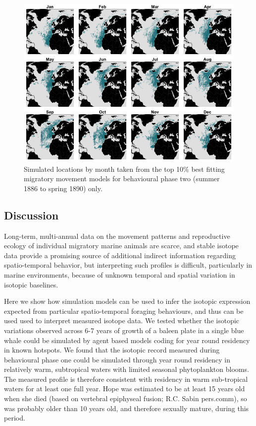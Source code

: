 \documentclass[a4paper,12pt]{article}
\begin{document}
\begin{figure}
 \centering
  \includegraphics[width = \linewidth]{figures/Figure-4-monthly.png}
  \caption{Simulated locations by month taken from the top 10\% best fitting migratory movement models for behavioural phase two (summer 1886 to spring 1890) only.}
  \label{fig4}
\end{figure}

\subsection{Discussion}
Long-term, multi-annual data on the movement patterns and reproductive ecology of individual migratory marine animals are scarce, and stable isotope data provide a promising source of additional indirect information regarding spatio-temporal behavior, but interpreting such profiles is difficult, particularly in marine environments, because of unknown temporal and spatial variation in isotopic baselines.

Here we show how simulation models can be used to infer the isotopic expression expected from particular spatio-temporal foraging behaviours, and thus can be used used to interpret measured isotope data. 
We tested whether the isotopic variations observed across 6-7 years of growth of a baleen plate in a single blue whale could be simulated by agent based models coding for year round residency in known hotspots. 
We found that the isotopic record measured during behavioural phase one could be simulated through year round residency in relatively warm, subtropical waters with limited seasonal phytoplankton blooms. 
The measured profile is therefore consistent with residency in warm sub-tropical waters for at least one full year.
Hope was estimated to be at least 15 years old when she died (based on vertebral epiphyseal fusion; R.C. Sabin pers.comm), so was probably older than 10 years old, and therefore sexually mature, during this period.
\end{document}
